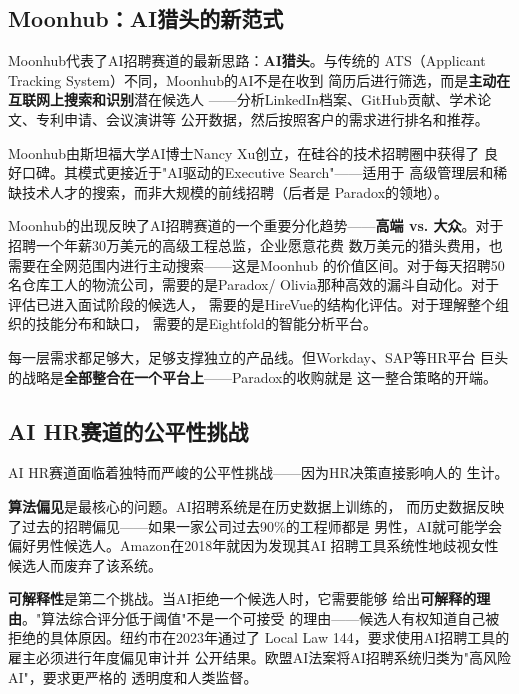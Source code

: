 \subsection{Moonhub：AI猎头的新范式}
\label{subsec:moonhub}

Moonhub代表了AI招聘赛道的最新思路：\textbf{AI猎头}。与传统的
ATS（Applicant Tracking System）不同，Moonhub的AI不是在收到
简历后进行筛选，而是\textbf{主动在互联网上搜索和识别}潜在候选人
——分析LinkedIn档案、GitHub贡献、学术论文、专利申请、会议演讲等
公开数据，然后按照客户的需求进行排名和推荐。

Moonhub由斯坦福大学AI博士Nancy Xu创立，在硅谷的技术招聘圈中获得了
良好口碑。其模式更接近于"AI驱动的Executive Search"——适用于
高级管理层和稀缺技术人才的搜索，而非大规模的前线招聘（后者是
Paradox的领地）。

Moonhub的出现反映了AI招聘赛道的一个重要分化趋势——\textbf{高端
vs. 大众}。对于招聘一个年薪30万美元的高级工程总监，企业愿意花费
数万美元的猎头费用，也需要在全网范围内进行主动搜索——这是Moonhub
的价值区间。对于每天招聘50名仓库工人的物流公司，需要的是Paradox/
Olivia那种高效的漏斗自动化。对于评估已进入面试阶段的候选人，
需要的是HireVue的结构化评估。对于理解整个组织的技能分布和缺口，
需要的是Eightfold的智能分析平台。

每一层需求都足够大，足够支撑独立的产品线。但Workday、SAP等HR平台
巨头的战略是\textbf{全部整合在一个平台上}——Paradox的收购就是
这一整合策略的开端。

\subsection{AI HR赛道的公平性挑战}
\label{subsec:hr-fairness}

AI HR赛道面临着独特而严峻的公平性挑战——因为HR决策直接影响人的
生计。

\textbf{算法偏见}是最核心的问题。AI招聘系统是在历史数据上训练的，
而历史数据反映了过去的招聘偏见——如果一家公司过去90\%的工程师都是
男性，AI就可能学会偏好男性候选人。Amazon在2018年就因为发现其AI
招聘工具系统性地歧视女性候选人而废弃了该系统。

\textbf{可解释性}是第二个挑战。当AI拒绝一个候选人时，它需要能够
给出\textbf{可解释的理由}。"算法综合评分低于阈值"不是一个可接受
的理由——候选人有权知道自己被拒绝的具体原因。纽约市在2023年通过了
Local Law 144，要求使用AI招聘工具的雇主必须进行年度偏见审计并
公开结果。欧盟AI法案将AI招聘系统归类为"高风险AI"，要求更严格的
透明度和人类监督。

